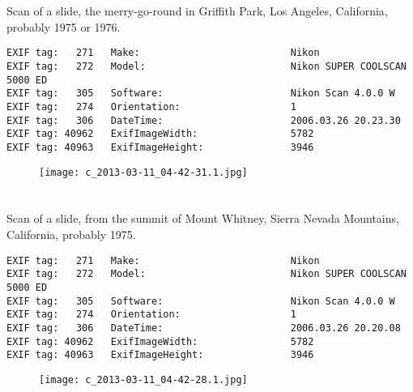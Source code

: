 \section{\protect{}}
\noindent Scan of a slide, the merry-go-round in Griffith Park, Los Angeles, California, probably 1975 or 1976.
\noindent
\begin{lstlisting}
EXIF tag:   271   Make:                          Nikon
EXIF tag:   272   Model:                         Nikon SUPER COOLSCAN 5000 ED
EXIF tag:   305   Software:                      Nikon Scan 4.0.0 W
EXIF tag:   274   Orientation:                   1
EXIF tag:   306   DateTime:                      2006.03.26 20.23.30
EXIF tag: 40962   ExifImageWidth:                5782
EXIF tag: 40963   ExifImageHeight:               3946

\end{lstlisting}
\clearpage
\begin{figure}
\raggedleft
\texttt{[image: c\_2013-03-11\_04-42-31.1.jpg]}
\end{figure}


\clearpage
\section{\protect{}}
\noindent Scan of a slide, from the summit of Mount Whitney, Sierra Nevada Mountains, California, probably 1975.
\noindent
\begin{lstlisting}
EXIF tag:   271   Make:                          Nikon
EXIF tag:   272   Model:                         Nikon SUPER COOLSCAN 5000 ED
EXIF tag:   305   Software:                      Nikon Scan 4.0.0 W
EXIF tag:   274   Orientation:                   1
EXIF tag:   306   DateTime:                      2006.03.26 20.20.08
EXIF tag: 40962   ExifImageWidth:                5782
EXIF tag: 40963   ExifImageHeight:               3946

\end{lstlisting}
\clearpage
\begin{figure}
\raggedleft
\texttt{[image: c\_2013-03-11\_04-42-28.1.jpg]}
\end{figure}


\clearpage
